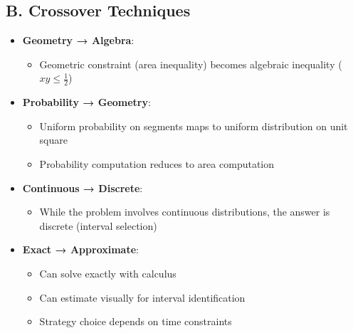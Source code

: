 \documentclass[11pt]{article}
\begin{document}
\begin{tacticalbox}
\subsection*{B. Crossover Techniques}
\begin{itemize}[leftmargin=*]
    \item \textbf{Geometry → Algebra}: 
    \begin{itemize}
        \item Geometric constraint (area inequality) becomes algebraic inequality ($xy \leq \frac{1}{2}$)
    \end{itemize}
    
    \item \textbf{Probability → Geometry}: 
    \begin{itemize}
        \item Uniform probability on segments maps to uniform distribution on unit square
        \item Probability computation reduces to area computation
    \end{itemize}
    
    \item \textbf{Continuous → Discrete}: 
    \begin{itemize}
        \item While the problem involves continuous distributions, the answer is discrete (interval selection)
    \end{itemize}
    
    \item \textbf{Exact → Approximate}: 
    \begin{itemize}
        \item Can solve exactly with calculus
        \item Can estimate visually for interval identification
        \item Strategy choice depends on time constraints
    \end{itemize}
\end{itemize}
\end{tacticalbox}
\end{document}

